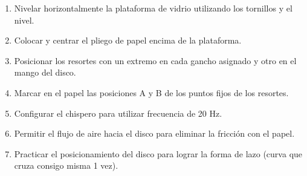 \documentclass[../main.tex]{subfiles}
\begin{document}
\begin{enumerate}
  \item Nivelar horizontalmente la plataforma de vidrio utilizando los tornillos y el nivel.
  \item Colocar y centrar el pliego de papel encima de la plataforma.
  \item Posicionar los resortes con un extremo en cada gancho asignado y otro en el mango del disco.
  \item Marcar en el papel las posiciones A y B de los puntos fijos de los resortes.
  \item Configurar el chispero para utilizar frecuencia de 20 Hz.
  \item Permitir el flujo de aire hacia el disco para eliminar la fricción con el papel.
  \item Practicar el posicionamiento del disco para lograr la forma de lazo (curva que cruza consigo misma 1 vez).
\end{enumerate}
\end{document}

